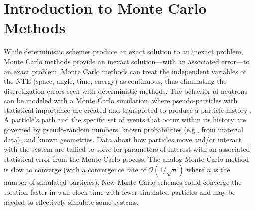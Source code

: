 \chapter{Introduction to Monte Carlo Methods}


\label{chap:mc_methods_intro}


While deterministic schemes produce an exact solution to an inexact problem, Monte Carlo methods provide an inexact solution---with an associated error---to an exact problem.
Monte Carlo methods can treat the independent variables of the NTE (space, angle, time, energy) as continuous, thus eliminating the discretization errors seen with deterministic methods.
The behavior of neutrons can be modeled with a Monte Carlo simulation, where pseudo-particles with statistical importance are created and transported to produce a particle history \cite{lewis_computational_1984}.
A particle's path and the specific set of events that occur within its history are governed by pseudo-random numbers, known probabilities (e.g., from material data), and known geometries.
Data about how particles move and/or interact with the system are tallied to solve for parameters of interest with an associated statistical error from the Monte Carlo process. 
The analog Monte Carlo method is slow to converge (with a convergence rate of $\mathcal{O}(1/\sqrt{n})$ where $n$ is the number of simulated particles).
New Monte Carlo schemes could converge the solution faster in wall-clock time with fewer simulated particles and may be needed to effectively simulate some systems.


